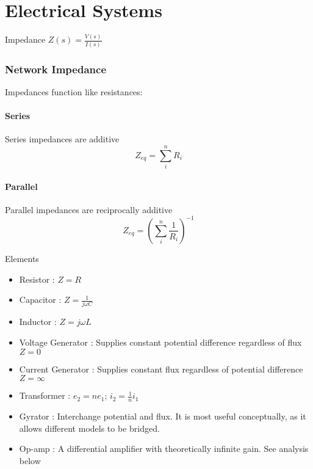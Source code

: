 \documentclass{../templates/topic}
\begin{document}
\chapter{Electrical Systems}

\begin{section}{Impedance}
	 $Z(s)=\frac{V(s)}{I(s)}$
	
	\subsection{Network Impedance}
	Impedances function like resistances:
	\subsubsection*{Series}
	Series impedances are additive
	\begin{equation}
		Z_{eq} = \sum_{i}^{n}{R_i}
	\end{equation}
	\subsubsection*{Parallel}
	Parallel impedances are reciprocally additive
	\begin{equation}
		Z_{eq} = (\sum_{i}^{n}{\frac{1}{R_i}})^{-1}
	\end{equation}
\end{section}

\begin{section}{Elements}
	\begin{itemize}
		\item Resistor : $Z=R$
		\item Capacitor : $Z=\frac{1}{j\omega C}$
		\item Inductor : $Z=j\omega L$
		\item Voltage Generator : Supplies constant potential difference regardless of flux $Z=0$
		\item Current Generator : Supplies constant flux regardless of potential difference $Z=\infty$
		\item Transformer : $e_2 = ne_1$; $i_2 = \frac{1}{n}i_1$
		\item Gyrator : Interchange potential and flux. It is most useful conceptually, as it allows different models to be bridged.
		\item Op-amp : A differential amplifier with theoretically infinite gain. See analysis below
	\end{itemize}
\end{section}
\end{document}
